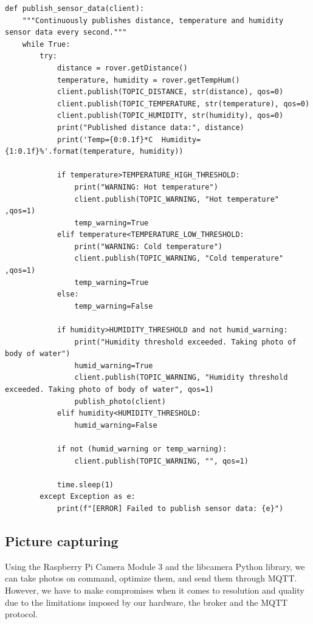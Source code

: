 \begin{lstlisting}[style=courier12]
    def publish_sensor_data(client):
    """Continuously publishes distance, temperature and humidity sensor data every second."""
    while True:
        try:
            distance = rover.getDistance()
            temperature, humidity = rover.getTempHum()
            client.publish(TOPIC_DISTANCE, str(distance), qos=0)
            client.publish(TOPIC_TEMPERATURE, str(temperature), qos=0)
            client.publish(TOPIC_HUMIDITY, str(humidity), qos=0)
            print("Published distance data:", distance)
            print('Temp={0:0.1f}*C  Humidity={1:0.1f}%'.format(temperature, humidity))
            
            if temperature>TEMPERATURE_HIGH_THRESHOLD:
                print("WARNING: Hot temperature")
                client.publish(TOPIC_WARNING, "Hot temperature" ,qos=1)
                temp_warning=True
            elif temperature<TEMPERATURE_LOW_THRESHOLD:
                print("WARNING: Cold temperature")
                client.publish(TOPIC_WARNING, "Cold temperature" ,qos=1)
                temp_warning=True
            else:
                temp_warning=False
            
            if humidity>HUMIDITY_THRESHOLD and not humid_warning:
                print("Humidity threshold exceeded. Taking photo of body of water")
                humid_warning=True
                client.publish(TOPIC_WARNING, "Humidity threshold exceeded. Taking photo of body of water", qos=1)
                publish_photo(client)
            elif humidity<HUMIDITY_THRESHOLD:
                humid_warning=False
            
            if not (humid_warning or temp_warning):
                client.publish(TOPIC_WARNING, "", qos=1)
            
            time.sleep(1)
        except Exception as e:
            print(f"[ERROR] Failed to publish sensor data: {e}")
\end{lstlisting}

\subsection{Picture capturing}

Using the Raspberry Pi Camera Module 3 and the libcamera Python library, we can take photos on command, optimize them, and send them through MQTT. However, we have to make compromises when it comes to resolution and quality due to the limitations imposed by our hardware, the broker and the MQTT protocol.

